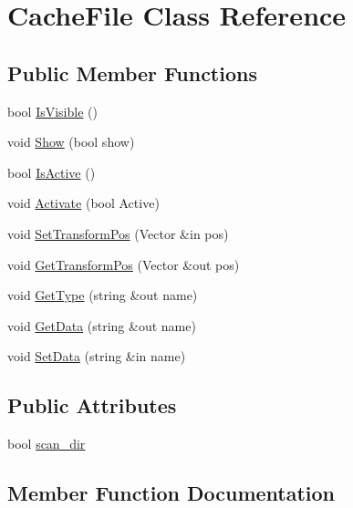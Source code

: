 \hypertarget{class_cache_file}{}\section{Cache\+File Class Reference}
\label{class_cache_file}
\subsection*{Public Member Functions}
\begin{DoxyCompactItemize}
\item 
bool \hyperlink{class_cache_file_a1d8c0ab49b9716df427987bceb26b82a}{Is\+Visible} ()
\item 
void \hyperlink{class_cache_file_a9ca31ec96700e19dc9ae255b0c2ea777}{Show} (bool show)
\item 
bool \hyperlink{class_cache_file_ab4b159fa4a0c823092222722b2ba2d8a}{Is\+Active} ()
\item 
void \hyperlink{class_cache_file_a756bd481413d186eddade5a9cc91c8aa}{Activate} (bool Active)
\item 
void \hyperlink{class_cache_file_aa0873796ac7e2babf12cfcd64d20fc16}{Set\+Transform\+Pos} (Vector \&in pos)
\item 
void \hyperlink{class_cache_file_a1fc0844ecf5973618fa0d3c26f0a28a0}{Get\+Transform\+Pos} (Vector \&out pos)
\item 
void \hyperlink{class_cache_file_a3873c52b039643de0b9501f64cacac62}{Get\+Type} (string \&out name)
\item 
void \hyperlink{class_cache_file_a1f7e966e43bd4d510c6c769d04ca4d22}{Get\+Data} (string \&out name)
\item 
void \hyperlink{class_cache_file_a74e4250433dda103bf580dca88877329}{Set\+Data} (string \&in name)
\end{DoxyCompactItemize}
\subsection*{Public Attributes}
\begin{DoxyCompactItemize}
\item 
bool \hyperlink{class_cache_file_a7a3c883612696d6a94787471ede49afc}{scan\+\_\+dir}
\end{DoxyCompactItemize}


\subsection{Member Function Documentation}
\hypertarget{class_cache_file_a756bd481413d186eddade5a9cc91c8aa}{}\label{class_cache_file_a756bd481413d186eddade5a9cc91c8aa} 
